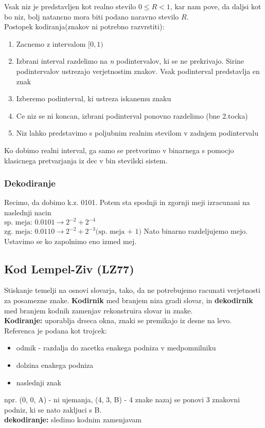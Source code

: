 \documentclass{article}
\begin{document}
\begin{multicols}{2}
	Vsak niz je predstavljen kot realno stevilo $0 \leq R < 1$, kar nam pove, da daljsi kot bo niz,
	bolj natancno mora biti podano naravno stevilo $R$.\\
	Postopek kodiranja(znakov ni potrebno razvrstiti):
	\begin{enumerate}
		\item Zacnemo z intervalom $[0, 1)$
		\item Izbrani interval razdelimo na \textit{n} podintervalov, ki se ne prekrivajo. Sirine podintervalov ustrezajo
		      verjetnostim znakov. Vsak podinterval predstavlja en znak
		\item Izberemo podinterval, ki ustreza iskanemu znaku
		\item Ce niz se ni koncan, izbrani podinterval ponovno razdelimo (bne 2.tocka)
		\item Niz lahko predstavimo s poljubnim realnim stevilom v zadnjem podintervalu
	\end{enumerate}
	Ko dobimo realni interval, ga samo se pretvorimo v binarnega s pomocjo klasicnega pretvarjanja
	iz dec v bin stevilski sistem.

	\subsubsection{Dekodiranje}
	Recimo, da dobimo k.z. 0101. Potem sta spodnji in zgornji meji izracunani na
	naslednji nacin\\
	\begin{math}
		\text{sp. meja: } 0.0101 \rightarrow 2^{-2} + 2^{-4}
	\end{math}\\
	\begin{math}
		\text{zg. meja: } 0.0110 \rightarrow 2^{-2} + 2^{-3} \text{(sp. meja + 1)}
	\end{math}
	Nato binarno razdeljujemo mejo. Ustavimo se ko zapolnimo eno izmed mej.

	\subsection{Kod Lempel-Ziv (LZ77)}
	Stiskanje temelji na osnovi slovarja, tako, da ne potrebujemo
	racunati verjetnosti za posamezne znake. \textbf{Kodirnik}
	med branjem niza gradi slovar, in \textbf{dekodirnik} med branjem
	kodnih zamenjav rekonstruira slovar in znake.\\
	\textbf{Kodiranje:} uporablja drseca okna, znaki se premikajo iz desne na levo.
	Referenca je podana kot trojcek:
	\begin{itemize}
		\item odmik - razdalja do zacetka enakega podniza v medpomnilniku
		\item dolzina enakega podniza
		\item naslednji znak
	\end{itemize}
	npr. (0, 0, A) - ni ujemanja, (4, 3, B) - 4 znake nazaj se ponovi 3 znakovni podniz, ki se nato zakljuci s B.\\
	\textbf{dekodiranje:} sledimo kodnim zamenjavam


\end{multicols}
\end{document}
